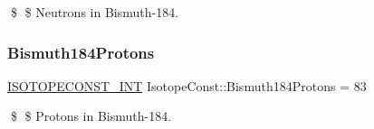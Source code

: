 \$ \$ Neutrons in Bismuth-\/184. \mbox{\label{group___isotope_const-_bismuth-_bi184_gaf3a7101513fddc6d2269e96e0a0039ed}} 
\subsubsection{\texorpdfstring{Bismuth184\+Protons}{Bismuth184Protons}}
{\footnotesize\ttfamily \mbox{\hyperlink{group___isotope_const-_macros_ga5f18360b3e99483a35c32d789e62621c}{I\+S\+O\+T\+O\+P\+E\+C\+O\+N\+S\+T\+\_\+\+I\+NT}} Isotope\+Const\+::\+Bismuth184\+Protons = 83}

\$ \$ Protons in Bismuth-\/184. 